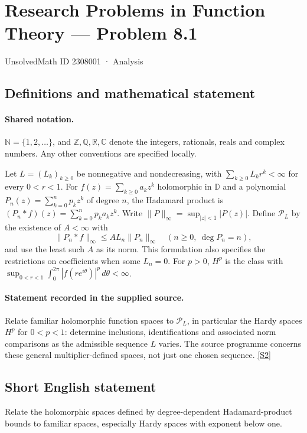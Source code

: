 \documentclass[11pt]{article}
\newcommand{\sref}[2]{\hyperlink{source:#1:#2}{[S#2]}}
\begin{document}
\setcounter{section}{2308000}
\section{Research Problems in Function Theory — Problem 8.1}\label{2308001}
{\small\sffamily UnsolvedMath ID 2308001 · Analysis}
\subsection{Definitions and mathematical statement}

\paragraph{Shared notation.}$\mathbb N=\{1,2,\ldots\}$, and $\mathbb Z,\mathbb Q,\mathbb R,\mathbb C$ denote the integers, rationals, reals and complex numbers. Any other conventions are specified locally.


Let $L=(L_k)_{k\ge0}$ be nonnegative and nondecreasing, with $\sum_{k\ge0}L_kr^k<\infty$ for every $0<r<1$. For $f(z)=\sum_{k\ge0}a_kz^k$ holomorphic in $\mathbb D$ and a polynomial $P_n(z)=\sum_{k=0}^np_kz^k$ of degree $n$, the Hadamard product is $(P_n*f)(z)=\sum_{k=0}^np_ka_kz^k$. Write $\|P\|_\infty=\sup_{|z|<1}|P(z)|$. Define $\mathcal P_L$ by the existence of $A<\infty$ with
\[\|P_n*f\|_\infty\le A L_n\|P_n\|_\infty\quad(n\ge0,\ \deg P_n=n),
\]
and use the least such $A$ as its norm. This formulation also specifies the restrictions on coefficients when some $L_n=0$. For $p>0$, $H^p$ is the class with $\sup_{0<r<1}\int_0^{2\pi}|f(re^{i\theta})|^p\,d\theta<\infty$.
\paragraph{Statement recorded in the supplied source.}
Relate familiar holomorphic function spaces to $\mathcal P_L$, in particular the Hardy spaces $H^p$ for $0<p<1$: determine inclusions, identifications and associated norm comparisons as the admissible sequence $L$ varies. The source programme concerns these general multiplier-defined spaces, not just one chosen sequence. \sref{2308001}{2}
\subsection{Short English statement}
Relate the holomorphic spaces defined by degree-dependent Hadamard-product bounds to familiar spaces, especially Hardy spaces with exponent below one.
\end{document}
